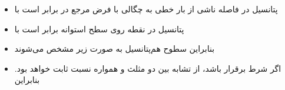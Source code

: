 \begin{ELimportant}{}


\end{ELimportant}

\begin{ELunit}

\begin{itemize}
\tightlist
\item
  پتانسیل در فاصله  ناشی از بار خطی به چگالی \ELim{\rho_\ell} با فرض مرجع در  برابر است با
\end{itemize}


\begin{itemize}
\tightlist
\item
  پتانسیل در نقطه  روی سطح استوانه برابر است با
\end{itemize}


\begin{itemize}
\tightlist
\item
  بنابراین سطوح هم‌پتانسیل به صورت زیر مشخص می‌شوند
\end{itemize}



\end{ELunit}

\begin{ELjoin}

\begin{itemize}
\tightlist
\item
  اگر شرط  برقرار باشد، از تشابه بین دو مثلث  و  همواره نسبت  ثابت خواهد بود. بنابراین
\end{itemize}

\begin{ELimportant}{}


\end{ELimportant}

\end{ELjoin}

